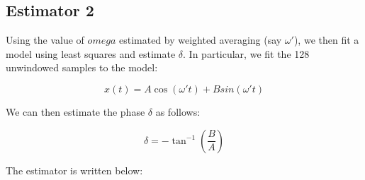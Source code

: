 \documentclass[11pt]{article}
\begin{document}
	
		
    \subsection{Estimator 2}\label{estimator-2}

	

	
		
    Using the value of \(omega\) estimated by weighted averaging (say
\(\omega'\)), we then fit a model using least squares and estimate
\(\delta\). In particular, we fit the 128 unwindowed samples to the
model:

\[x(t) = A \cos (\omega' t) + B sin(\omega' t)\]

We can then estimate the phase \(\delta\) as follows:

\[\delta = - \tan^{-1} \left( \frac{B}{A} \right)\]

The estimator is written below:

	

	
		
	
	
		
	
		
			
		
	
		
			
		
	
		
			
		
	
		
			
		
	
		
			
		
	
		
			
		
	
		
			
		
	
		
			
		
	
		
			
		
	
		
			
		
	
		
			
		
	
		
			
		
	
		
			
		
	
		
			
		
	
		
			
		
	
		
			
		
	
\end{document}

